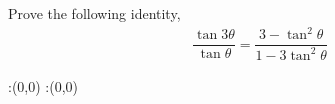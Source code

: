 
%
%
%
%
% 
% 

\question Prove the following identity,
\begin{align}
  \dfrac{\tan3\theta}{\tan\theta} 
    = \dfrac{3-\tan^2\theta}{1-3\tan^2\theta} \nonumber
\end{align} 

\insertQR{}

\ifprintanswers
  \begin{marginfigure}
      :(0,0)
      :(0,0)
    \figdrawbegin{}
      \figdrawline [100,101]
    \figdrawend
    \figvisu{\figBoxA}{}{%
    }
    \centerline{\box\figBoxA}
  \end{marginfigure}
\fi 


